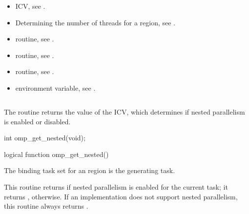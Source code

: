 \crossreferences
\begin{itemize}
\item {} ICV, see 
.

\item Determining the number of threads for a  region, see
. 

\item {} routine, see 
.

\item {} routine, see 
.

\item {} routine, see 
.

\item {} environment variable, see 
.
\end{itemize}








\subsection{}
\label{subsec:omp_get_nested}
\summary
The  routine returns the value of the  ICV, which 
determines if nested parallelism is enabled or disabled.

\format
\ccppspecificstart
\begin{boxedcode}
int omp\_get\_nested(void);
\end{boxedcode}
\ccppspecificend

\fortranspecificstart
\begin{boxedcode}
logical function omp\_get\_nested()
\end{boxedcode}
\fortranspecificend

\binding
The binding task set for an  region is the generating task. 

\effect
This routine returns  if nested parallelism is enabled for the current task; it returns 
, otherwise. If an implementation does not support nested parallelism, this routine 
always returns .


